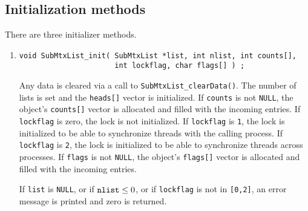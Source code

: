 \subsection{Initialization methods}
\label{subsection:SubMtxList:proto:initial}
\par
There are three initializer methods.
\par
\begin{enumerate}
\item
\begin{verbatim}
void SubMtxList_init( SubMtxList *list, int nlist, int counts[], 
                      int lockflag, char flags[] ) ;
\end{verbatim}
Any data is cleared via a call to
{\tt SubMtxList\_clearData()}.
The number of lists is set and the {\tt heads[]} vector is
initialized.
If {\tt counts} is not {\tt NULL}, the object's {\tt counts[]}
vector is allocated and filled with the incoming entries.
If {\tt lockflag} is zero, the lock is not initialized.
If {\tt lockflag} is {\tt 1}, the lock is initialized
to be able to synchronize threads with the calling process.
If {\tt lockflag} is {\tt 2}, the lock is initialized
to be able to synchronize threads across processes.
If {\tt flags} is not {\tt NULL}, the object's {\tt flags[]}
vector is allocated and filled with the incoming entries.
\par {}
If {\tt list} is {\tt NULL},
or if ${\tt nlist} \le 0$,
or if {\tt lockflag} is not in {\tt [0,2]},
an error message is printed and zero is returned.
\end{enumerate}
\par

